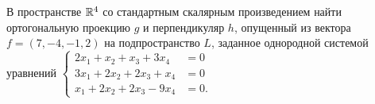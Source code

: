 \documentclass[addpoints, answers]{exam} %
\begin{document}
\begin{questions}
\question[10] В пространстве $\mathbb R^4$ со стандартным скалярным произведением найти ортогональную проекцию $g$ и перпендикуляр $h$, опущенный из вектора $f=(7,-4,-1,2)$ на подпространство $L$, заданное однородной системой уравнений 
$\left\{\begin{aligned}
2x_1+x_2+x_3+3x_4 &=0\\
3x_1+2x_2+2x_3+x_4 &=0\\
x_1+2x_2+2x_3-9x_4 &=0.
\end{aligned}\right.$\\


\end{questions}
\end{document}
